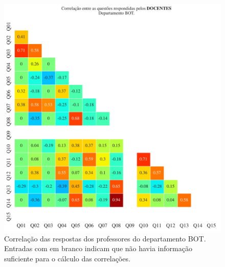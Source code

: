 \documentclass[a4paper,10pt]{article}
\begin{document}
\begin{figure}[h]
\centering
\includegraphics[width=0.999\linewidth]{matriz_corr__BOT_docentes.png}
\caption{\label{fig:corr_docentes}Correlação das respostas dos professores do departamento BOT. Entradas com em branco indicam que não havia informação suficiente para o cálculo das correlações.}
\end{figure}
\end{document}
